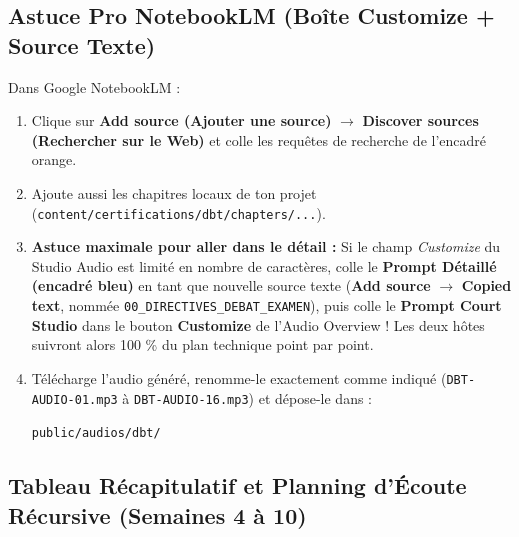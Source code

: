 \documentclass[11pt,a4paper]{article}
\begin{document}
\subsection{Astuce Pro NotebookLM (Boîte Customize + Source Texte)}
Dans Google NotebookLM :
\begin{enumerate}[label=\textbf{Étape \arabic* :}]
    \item Clique sur \textbf{Add source (Ajouter une source)} $\rightarrow$ \textbf{Discover sources (Rechercher sur le Web)} et colle les requêtes de recherche de l'encadré orange.
    \item Ajoute aussi les chapitres locaux de ton projet (\texttt{content/certifications/dbt/chapters/...}).
    \item \textbf{Astuce maximale pour aller dans le détail :} Si le champ \textit{Customize} du Studio Audio est limité en nombre de caractères, colle le \textbf{Prompt Détaillé (encadré bleu)} en tant que nouvelle source texte (\textbf{Add source} $\rightarrow$ \textbf{Copied text}, nommée \texttt{00\_DIRECTIVES\_DEBAT\_EXAMEN}), puis colle le \textbf{Prompt Court Studio} dans le bouton \textbf{Customize} de l'Audio Overview ! Les deux hôtes suivront alors 100 \% du plan technique point par point.
    \item Télécharge l'audio généré, renomme-le exactement comme indiqué (\texttt{DBT-AUDIO-01.mp3} à \texttt{DBT-AUDIO-16.mp3}) et dépose-le dans :
    \begin{center}
        \texttt{public/audios/dbt/}
    \end{center}
\end{enumerate}

\subsection{Tableau Récapitulatif et Planning d'Écoute Récursive (Semaines 4 à 10)}
\end{document}
